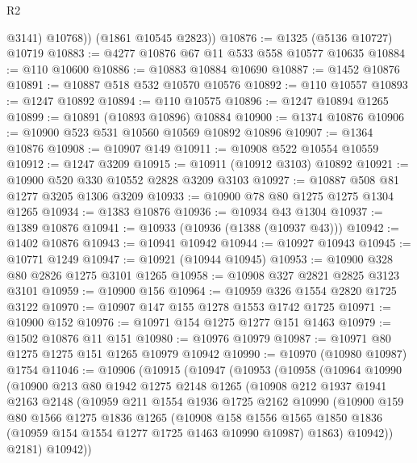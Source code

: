 \begin{lexlean}{R2}
\begin{coremodule}
            @3141)
          @10768))
      (@1861 @10545 @2823))
@10876 := @1325 (@5136 @10727) @10719
@10883 := @4277 @10876 @67 @11 @533 @558 @10577 @10635
@10884 := @110 @10600
@10886 := @10883 @10884 @10690
@10887 := @1452 @10876
@10891 := @10887 @518 @532 @10570 @10576
@10892 := @110 @10557
@10893 := @1247 @10892
@10894 := @110 @10575
@10896 := @1247 @10894 @1265
@10899 := @10891 (@10893 @10896) @10884
@10900 := @1374 @10876
@10906 := @10900 @523 @531 @10560 @10569 @10892 @10896
@10907 := @1364 @10876
@10908 := @10907 @149
@10911 := @10908 @522 @10554 @10559
@10912 := @1247 @3209
@10915 := @10911 (@10912 @3103) @10892
@10921 := @10900 @520 @330 @10552 @2828 @3209 @3103
@10927 := @10887 @508 @81 @1277 @3205 @1306 @3209
@10933 := @10900 @78 @80 @1275 @1275 @1304 @1265
@10934 := @1383 @10876
@10936 := @10934 @43 @1304
@10937 := @1389 @10876
@10941 := @10933 (@10936 (@1388 (@10937 @43)))
@10942 := @1402 @10876
@10943 := @10941 @10942
@10944 := @10927 @10943
@10945 := @10771 @1249
@10947 := @10921 (@10944 @10945)
@10953 := @10900 @328 @80 @2826 @1275 @3101 @1265
@10958 := @10908 @327 @2821 @2825 @3123 @3101
@10959 := @10900 @156
@10964 := @10959 @326 @1554 @2820 @1725 @3122
@10970 := @10907 @147 @155 @1278 @1553 @1742 @1725
@10971 := @10900 @152
@10976 := @10971 @154 @1275 @1277 @151 @1463
@10979 := @1502 @10876 @11 @151
@10980 := @10976 @10979
@10987 := @10971 @80 @1275 @1275 @151 @1265 @10979 @10942
@10990 := @10970 (@10980 @10987) @1754
@11046 := @10906
    (@10915
      (@10947
        (@10953
          (@10958
            (@10964
              @10990
              (@10900
                @213
                @80
                @1942
                @1275
                @2148
                @1265
                (@10908
                  @212
                  @1937
                  @1941
                  @2163
                  @2148
                  (@10959
                    @211
                    @1554
                    @1936
                    @1725
                    @2162
                    @10990
                    (@10900
                      @159
                      @80
                      @1566
                      @1275
                      @1836
                      @1265
                      (@10908
                        @158
                        @1556
                        @1565
                        @1850
                        @1836
                        (@10959 @154 @1554 @1277 @1725 @1463 @10990 @10987)
                        @1863)
                      @10942))
                  @2181)
                @10942))

\end{coremodule}
\end{lexlean}
